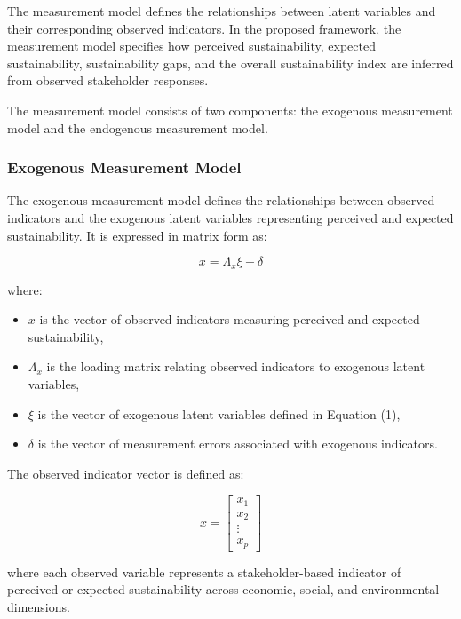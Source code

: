 \documentclass[11pt,a4paper]{article}
\begin{document}
The measurement model defines the relationships between latent variables and their corresponding observed indicators. In the proposed framework, the measurement model specifies how perceived sustainability, expected sustainability, sustainability gaps, and the overall sustainability index are inferred from observed stakeholder responses.

The measurement model consists of two components: the exogenous measurement model and the endogenous measurement model.

\subsubsection{Exogenous Measurement Model}

The exogenous measurement model defines the relationships between observed indicators and the exogenous latent variables representing perceived and expected sustainability. It is expressed in matrix form as:

\begin{equation}
x = \Lambda_x \xi + \delta
\end{equation}

where:

\begin{itemize}
\item $x$ is the vector of observed indicators measuring perceived and expected sustainability,
\item $\Lambda_x$ is the loading matrix relating observed indicators to exogenous latent variables,
\item $\xi$ is the vector of exogenous latent variables defined in Equation (1),
\item $\delta$ is the vector of measurement errors associated with exogenous indicators.
\end{itemize}

The observed indicator vector is defined as:

\begin{equation}
x =
\begin{bmatrix}
x_1 \\
x_2 \\
\vdots \\
x_p
\end{bmatrix}
\end{equation}

where each observed variable represents a stakeholder-based indicator of perceived or expected sustainability across economic, social, and environmental dimensions.
\end{document}
